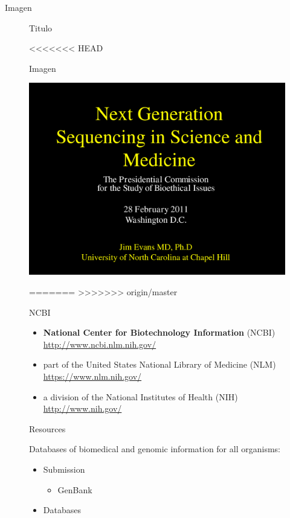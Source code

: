 \begin{frame}{Imagen}
\begin{figure}[htbp]
\begin{frame}{Titulo}
\end{frame}

<<<<<<< HEAD
\begin{frame}{Imagen}

\includegraphics[scale=.1]{images/foto}

\end{frame}

=======
>>>>>>> origin/master
\begin{frame}{NCBI}

\begin{itemize}
\item
  \textbf{National Center for Biotechnology Information} (NCBI)
  \url{http://www.ncbi.nlm.nih.gov/}
\item
  part of the United States National Library of Medicine (NLM)
  \url{https://www.nlm.nih.gov/}
\item
  a division of the National Institutes of Health (NIH)
  \url{http://www.nih.gov/}
\end{itemize}

\end{frame}

\begin{frame}{Resources}

Databases of biomedical and genomic information for all organisms:

\begin{itemize}
\itemsep1pt\parskip0pt
\item
  Submission

  \begin{itemize}
  \itemsep1pt\parskip0pt
  \item
    GenBank
  \end{itemize}
\item
  Databases


\end{itemize}
\end{frame}
\end{figure}
\end{frame}
